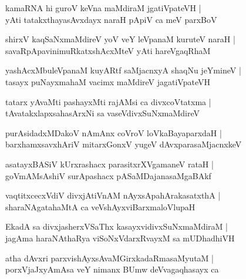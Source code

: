 \begin{shloka}
kamaRNA hi guroV keVna maMdiraM jgatiVpateVH |\\
yAti tatakxthayasAvxdayx naraH pApiV ca meV parxBoV
\end{shloka}

\begin{shloka}
shirxV kaqSaNxmaMdireV yoV veY leVpanaM kuruteV naraH |\\
savaRpApavinimuRkatxshAcxMteV yAti hareVgaqRhaM
\end{shloka}

\begin{shloka}
yashAcxMbuleVpanaM kuyARtf saMjacnxyA shaqNu jeYmineV |\\
tasayx puNayxmahaM vacimx maMdireV jagatiVpateVH
\end{shloka}

\begin{shloka}
tatarx yAvaMti pashayxMti rajAMsi ca divxcoVtatxma |\\
tAvatakxlapxsahasArxNi sa vaseVdivxSuNxmaMdireV
\end{shloka}

\begin{shloka}
purAsidadxMDakoV nAmAnx coVroV loVkaBayaparxdaH |\\
barxhamxsavxhAriV mitarxGonxV yugeV dAvxparasaMjacnxkeV
\end{shloka}

\begin{shloka}
asatayxBASiV kUrxrashacx parasitxrXVgamaneV rataH |\\
goVmAMsAshiV surApashacx pASaMDajanasaMgaBAkf
\end{shloka}

\begin{shloka}
vaqtitxcecxVdiV divxjAtiVnAM nAyxsApahArakasatxthA |\\
sharaNAgatahaMtA ca veVshAyxviBarxmaloVlupaH 
\end{shloka}

\begin{shloka}
EkadA sa divxjasherxVSaThx kasayxvidivxSuNxmaMdiraM |\\
jagAma haraNAthaRya viSoNxVdarxRvayxM sa mUDhadhiVH 
\end{shloka}

\begin{shloka}
atha dAvxri parxvishAyxsAvaMGirxkadaRmasaMyutaM |\\
porxVjaJxyAmAsa veY nimanx BUmw deVvagaqhasayx ca 
\end{shloka}

